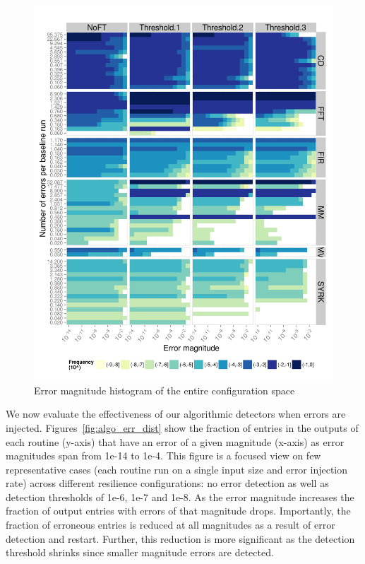 \documentclass{sig-alternate}
\begin{document}
\begin{figure}[ht!]
\centering
\includegraphics[width=1.00\columnwidth]{figs/4_1_1_Exp2_2_Heatmap_Error_ConfSpace.png}
\caption{Error magnitude histogram of the entire configuration space}
\label{fig:algo_err_heatmap}
\end{figure}

We now evaluate the effectiveness of our algorithmic detectors when errors are injected.
Figures~\ref{fig:algo_err_dist} show the fraction of entries in the outputs of each routine (y-axis) that have an error of a given magnitude (x-axis) as error magnitudes span from 1e-14 to 1e-4.
This figure is a focused view on few representative cases (each routine run on a single input size and error injection rate) across different resilience configurations: no error detection as well as detection thresholds of 1e-6, 1e-7 and 1e-8.
As the error magnitude increases the fraction of output entries with errors of that magnitude drops.
Importantly, the fraction of erroneous entries is reduced at all magnitudes as a result of error detection and restart.
Further, this reduction is more significant as the detection threshold shrinks since smaller magnitude errors are detected.
\end{document}
